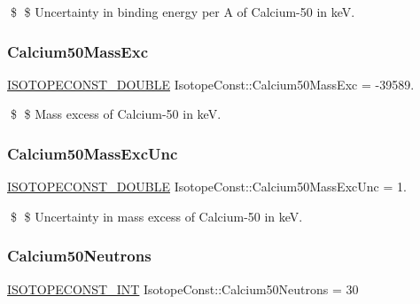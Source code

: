 \$ \$ Uncertainty in binding energy per A of Calcium-\/50 in keV. \mbox{\label{group___isotope_const-_calcium-_ca50_gae72963d3782dec32f9316c449361fdb4}} 
\subsubsection{\texorpdfstring{Calcium50\+Mass\+Exc}{Calcium50MassExc}}
{\footnotesize\ttfamily \mbox{\hyperlink{group___isotope_const-_macros_ga8f45a7272ce02c0b4c65c44636ed719a}{I\+S\+O\+T\+O\+P\+E\+C\+O\+N\+S\+T\+\_\+\+D\+O\+U\+B\+LE}} Isotope\+Const\+::\+Calcium50\+Mass\+Exc = -\/39589.}

\$ \$ Mass excess of Calcium-\/50 in keV. \mbox{\label{group___isotope_const-_calcium-_ca50_ga8221703707f2dafbb938aa2cd4546f03}} 
\subsubsection{\texorpdfstring{Calcium50\+Mass\+Exc\+Unc}{Calcium50MassExcUnc}}
{\footnotesize\ttfamily \mbox{\hyperlink{group___isotope_const-_macros_ga8f45a7272ce02c0b4c65c44636ed719a}{I\+S\+O\+T\+O\+P\+E\+C\+O\+N\+S\+T\+\_\+\+D\+O\+U\+B\+LE}} Isotope\+Const\+::\+Calcium50\+Mass\+Exc\+Unc = 1.}

\$ \$ Uncertainty in mass excess of Calcium-\/50 in keV. \mbox{\label{group___isotope_const-_calcium-_ca50_gafc1b33b675d54b43e86360a193ec731c}} 
\subsubsection{\texorpdfstring{Calcium50\+Neutrons}{Calcium50Neutrons}}
{\footnotesize\ttfamily \mbox{\hyperlink{group___isotope_const-_macros_ga5f18360b3e99483a35c32d789e62621c}{I\+S\+O\+T\+O\+P\+E\+C\+O\+N\+S\+T\+\_\+\+I\+NT}} Isotope\+Const\+::\+Calcium50\+Neutrons = 30}

